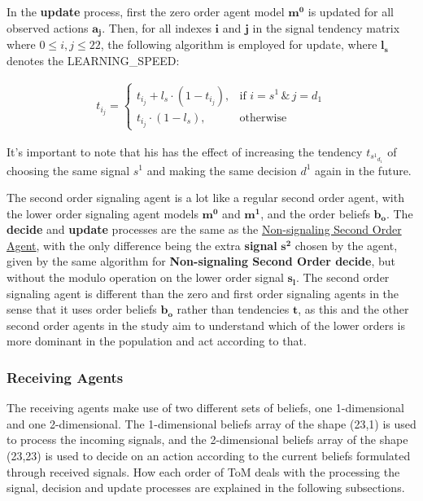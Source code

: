In the \textbf{update} process, first the zero order agent model $\mathbf{m^0}$ is updated for all observed actions $\mathbf{a_j}$. Then, for all indexes $\mathbf{i}$ and $\mathbf{j}$ in the signal tendency matrix where $0 \leq i, j \leq 22$, the following algorithm is employed for update, where $\mathbf{l_s}$ denotes the LEARNING\_SPEED:

\begin{equation*}
\begin{aligned}
    t_{i_j} = \begin{cases}
        t_{i_j} + l_s \cdot (1 - t_{i_j}), & \text{{if }} i = s^1 \, \& \, j = d_1 \\
        t_{i_j} \cdot (1 - l_s), & \text{{otherwise}}
    \end{cases}
\end{aligned}
\end{equation*}

It's important to note that his has the effect of increasing the tendency $t_{{s^1}_{d_1}}$ of choosing the same signal $s^1$ and making the same decision $d^1$ again in the future.


The second order signaling agent is a lot like a regular second order agent, with the lower order signaling agent models $\mathbf{m^0}$ and $\mathbf{m^1}$, and the order beliefs $\mathbf{b_o}$. The \textbf{decide} and \textbf{update} processes are the same as the \hyperref[eq:second-order-decide]{Non-signaling Second Order Agent}, with the only difference being the extra \textbf{signal} $\mathbf{s^2}$ chosen by the agent, given by the same algorithm for \textbf{Non-signaling Second Order decide}, but without the modulo operation on the lower order signal $\mathbf{s_l}$. The second order signaling agent is different than the zero and first order signaling agents in the sense that it uses order beliefs $\mathbf{b_o}$ rather than tendencies $\mathbf{t}$, as this and the other second order agents in the study aim to understand which of the lower orders is more dominant in the population and act according to that.

\subsubsection{Receiving Agents}

The receiving agents make use of two different sets of beliefs, one 1-dimensional and one 2-dimensional. The 1-dimensional beliefs array of the shape (23,1) is used to process the incoming signals, and the 2-dimensional beliefs array of the shape (23,23) is used to decide on an action according to the current beliefs formulated through received signals. How each order of ToM deals with the processing the signal, decision and update processes are explained in the following subsections.

